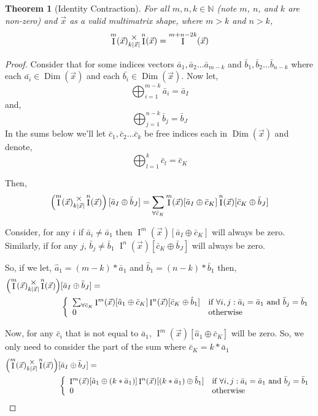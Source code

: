 \documentclass[12pt]{book}
\theoremstyle{plain}
\newtheorem{theorem}{Theorem}[chapter]
\theoremstyle{definition}
\theoremstyle{ppart}
\theoremstyle{case}
\theoremstyle{solution}
\DeclareMathOperator{\Dim}{Dim}
\DeclareMathOperator{\Ident}{I}
\newcommand{\mmult}[1]{\text{\raisebox{1ex}{$\underset{#1}{\times}$}}}
\newcommand{\shape}[1]{\left|#1\right|}
\begin{document}
\begin{landscape}
\begin{theorem}[Identity Contraction]
For all $m, n, k \in \mathbb{N}$ (note $m$, $n$, and $k$ are non-zero) and $\vec{x}$ as a valid multimatrix shape,
where $m > k$ and $n > k$,
\[ \Ident^m(\vec{x}) \mmult{k\shape{\vec{x}}} \Ident^n(\vec{x}) = \Ident^{m+n-2k}(\vec{x}) \]
\end{theorem}
\begin{proof}
Consider that for some indices vectors
$\bar{a}_1, \bar{a}_2 \ldots \bar{a}_{m-k}$
and $\bar{b}_1, \bar{b}_2 \ldots \bar{b}_{n-k}$ where each
$\bar{a_i} \in \Dim(\vec{x})$ and each $\bar{b_i} \in \Dim(\vec{x})$.
Now let,
\[ \bigoplus_{i=1}^{m-k} \bar{a}_i = \bar{a}_I \]
and,
\[ \bigoplus_{j=1}^{n-k} \bar{b}_j = \bar{b}_J \]
In the sums below we'll let $\bar{c}_1, \bar{c}_2 \ldots \bar{c}_k$ be free indices
each in $\Dim(\vec{x})$ and denote,
\[ \bigoplus_{l = 1}^k \bar{c}_l = \bar{c}_K \]

Then,
\[
\left( \Ident^m(\vec{x}) \mmult{k\shape{\vec{x}}} \Ident^n(\vec{x}) \right)
[\bar{a}_I \oplus \bar{b}_J] = 
\sum_{\forall \bar{c}_K} \Ident^m(\vec{x}) [\bar{a}_I \oplus \bar{c}_K] \Ident^n(\vec{x}) [\bar{c}_K \oplus \bar{b}_J]
\]

Consider, for any $i$ if $\bar{a}_i \ne \bar{a}_1$ then
$\Ident^m(\vec{x}) [\bar{a}_I \oplus \bar{c}_K]$ will always be zero.
Similarly, if for any $j$, $\bar{b}_j \ne \bar{b}_1$ 
$\Ident^n(\vec{x}) [\bar{c}_K \oplus \bar{b}_J]$ will always be zero.

So, if we let, $\hat{a}_1 = (m-k) * \bar{a}_1$ and $\hat{b}_1 = (n-k) * \bar{b}_1$ then,
\begin{align*}
\left( \Ident^m(\vec{x}) \mmult{k\shape{\vec{x}}} \Ident^n(\vec{x}) \right) &
[\bar{a}_I \oplus \bar{b}_J] = \\
&\left\{
  \begin{array}{ll}
    \sum_{\forall \bar{c}_K}
      \Ident^m(\vec{x}) [\hat{a}_1 \oplus \bar{c}_K] 
      \Ident^n(\vec{x}) [\bar{c}_K \oplus \hat{b}_1]
    & \mbox{if } \forall i, j : \bar{a}_i = \bar{a}_1 \mbox{ and } \bar{b}_j = \bar{b}_1 \\
    0 & \mbox{otherwise}
  \end{array}
\right.
\end{align*}

Now, for any $\bar{c}_i$ that is not equal to $\bar{a}_1$, 
$\Ident^m(\vec{x}) [\hat{a}_1 \oplus \bar{c}_K]$ will be zero.
So, we only need to consider the part of the sum where $\bar{c}_K = k * \bar{a}_1$
\begin{align*}
\left( \Ident^m(\vec{x}) \mmult{k\shape{\vec{x}}} \Ident^n(\vec{x}) \right) &
[\bar{a}_I \oplus \bar{b}_J] = \\
&\left\{
  \begin{array}{ll}
    \Ident^m(\vec{x}) [\hat{a}_1 \oplus (k * \bar{a}_1)] 
    \Ident^n(\vec{x}) [(k * \bar{a}_1) \oplus \hat{b}_1]
    & \mbox{if } \forall i, j : \bar{a}_i = \bar{a}_1 \mbox{ and } \bar{b}_j = \bar{b}_1 \\
    0 & \mbox{otherwise}
  \end{array}
\right.
\end{align*}


\end{proof}
\end{landscape}
\end{document}
